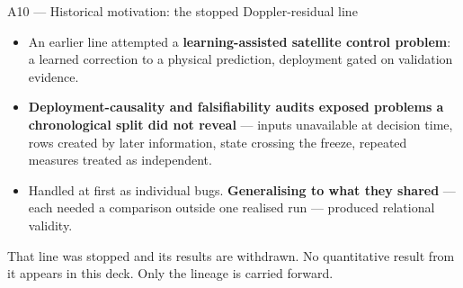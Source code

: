 \documentclass[aspectratio=169,11pt]{beamer}
\begin{document}
\begin{frame}{A10 --- Historical motivation: the stopped Doppler-residual line}
  \begin{center}
  \end{center}
  \vspace{0.5em}

  \small
  \begin{itemize}\itemsep0.32em
    \item An earlier line attempted a \textbf{learning-assisted satellite control problem}: a
          learned correction to a physical prediction, deployment gated on validation evidence.
    \item \textbf{Deployment-causality and falsifiability audits exposed problems a chronological
          split did not reveal} --- inputs unavailable at decision time, rows created by later
          information, state crossing the freeze, repeated measures treated as independent.
    \item Handled at first as individual bugs. \textbf{Generalising to what they shared} --- each
          needed a comparison outside one realised run --- produced relational validity.
  \end{itemize}

  {\footnotesize\textcolor{oewarn}{That line was stopped and its results are withdrawn. No
   quantitative result from it appears in this deck. Only the lineage is carried forward.}}
\end{frame}
\end{document}
